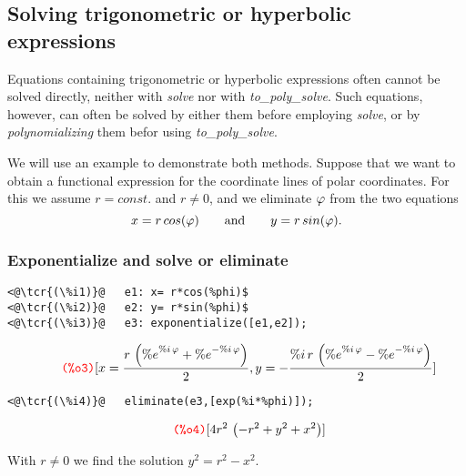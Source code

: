 \documentclass[../Maxima_Workbook.tex]{subfiles}
\begin{document}
\subsection{Solving trigonometric or hyperbolic expressions}\label{SE1}

Equations containing trigonometric or hyperbolic expressions often cannot be solved directly, neither with \emph{solve} nor with \emph{to\_poly\_solve}. Such equations, however, can often be solved by either  them before employing \emph{solve}, or by \emph{polynomializing} them befor using \emph{to\_poly\_solve}. 

\lz We will use an example to demonstrate both methods. Suppose that we want to obtain a functional expression for the coordinate lines of polar coordinates. For this we assume $ r=const. $ and $ r \neq 0 $, and we eliminate $ \varphi $ from the two equations
\begin{equation*}
	x=r \, cos(\varphi) \qquad \text{and} \qquad y=r \, sin(\varphi).
\end{equation*}

\subsubsection{Exponentialize and solve or eliminate}

\begin{small}
\color{blue} \leqn
\begin{lstlisting}
<@\tcr{(\%i1)}@   e1: x= r*cos(%phi)$ 
<@\tcr{(\%i2)}@   e2: y= r*sin(%phi)$ 
<@\tcr{(\%i3)}@   e3: exponentialize([e1,e2]);
\end{lstlisting}
\vspace{-4mm} \[\tag*{\tcr{\ttfamily (\%o3)}} [x=\frac{r \, \left( {{\% e}^{\% i \, \vap }}+{{\% e}^{-\% i \, \vap }}\right) }{2},y=-\frac{\% i \, r \, \left( {{\% e}^{\% i \, \vap }}-{{\% e}^{-\% i \, \vap }}\right) }{2}] \]
\vspace{-5mm} \begin{lstlisting}
<@\tcr{(\%i4)}@   eliminate(e3,[exp(%i*%phi)]);
\end{lstlisting}
\vspace{-4mm} \[\tag*{\tcr{\ttfamily (\%o4)}} [4 {r^{2}}\, \left( -{r^{2}}+{{y}^{2}}+{{x}^{2}}\right) ] \]
\color{black} \reqn
\end{small} \vspace{-4mm}

With $ r \neq 0 $ we find the solution $ y^2=r^2-x^2 $.
\lzzz
\end{document}
